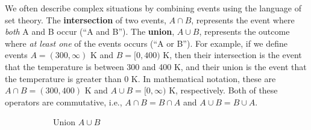 We often describe complex situations by combining events using the language of set theory. The \textbf{intersection} of two events, $A \cap B$, represents the event where \textit{both} A and B occur (``A and B''). The \textbf{union}, $A \cup B$, represents the outcome where \textit{at least one} of the events occurs (``A or B''). For example, if we define events $A = (300, \infty)$ K and $B = [0, 400)$ K, then their intersection is the event that the temperature is between 300 and 400 K, and their union is the event that the temperature is greater than 0 K. In mathematical notation, these are $A \cap B = (300, 400)$ K and $A \cup B = [0, \infty)$ K, respectively. Both of these operators are commutative, i.e., $A \cap B = B \cap A$ and $A \cup B = B \cup A$. 

\begin{figure}[h]
    \centering
    
    \begin{subfigure}[t]{0.47\textwidth}
    \centering
    \caption{Union $A\cup B$}
    \label{fig:venn-union}
    \end{subfigure}
    \hfill
    \begin{subfigure}[t]{0.47\textwidth}
    \centering
\end{subfigure}
\end{figure}
